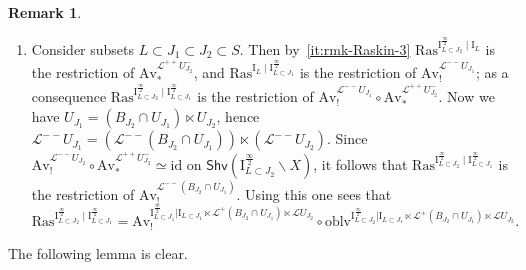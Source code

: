 \documentclass[11pt]{amsart}
\numberwithin{equation}{section}
\theoremstyle{plain}
\theoremstyle{definition}
\newtheorem{rmk}[thm]{Remark}
\newcommand{\sF}{{\mathcal F}}
\newcommand{\I}{{\mathrm I}}
\newcommand{\sL}{{\mathcal L}}
\newcommand{\id}{\mathrm{id}}
\newcommand{\semi}{{{\frac{\infty}{2}}}}
\newcommand{\oblv}{\mathrm{oblv}}
\newcommand{\Av}{\mathrm{Av}}
\newcommand{\simto}{\xrightarrow{\sim}}
\newcommand{\Shv}{\mathsf{Shv}}
\newcommand{\Ras}{\mathrm{Ras}}
\begin{document}
\begin{rmk}
\begin{enumerate}
\begin{equation}
\sL^{++} U_J^- \times \I_{L \subset J} \times \sL^+ U_J \simto \I_L.
\end{equation}
Combining this with the considerations in~\eqref{it:rmk-Raskin-2}, we obtain that for any $\sF$ in $\Shv \left( \I_{L \subset J}^{\semi} \backslash X \right)$ we have
\[
\Ras^{\I_{L \subset J}^{\semi} \mid \I_L}(\sF) \simeq \Av^{\sL^{++} U_J^-}_*(\sF)
\]
where we omit the forgetful functors, and as usual $\Av^{\sL^{++} U_J^-}_*$ is the right adjoint to the corresponding forgetful functor. Similarly, for $\sF$ in $\Shv \left( \I_L \backslash X \right)$ we have
\[
\Ras^{\I_L \mid \I_{L \subset J}^{\semi}}(\sF) \simeq \Av^{\sL^{--} U_J}_!(\sF).
\]
\item
Consider subsets $L \subset J_1 \subset J_2 \subset S$. Then by~\eqref{it:rmk-Raskin-3} $\Ras^{\I_{L \subset J_2}^{\semi} \mid \I_L}$ is the restriction of $\Av^{\sL^{++} U_{J_2}^-}_*$, and $\Ras^{\I_L \mid \I_{L \subset J_1}^{\semi}}$ is the restriction of $\Av^{\sL^{--} U_{J_1}}_!$; as a consequence $\Ras^{\I_{L \subset J_2}^{\semi} \mid \I_{L \subset J_1}^{\semi}}$ is the restriction of $\Av^{\sL^{--} U_{J_1}}_! \circ \Av^{\sL^{++} U_{J_2}^-}_*$. Now we have $U_{J_1} = (B_{J_2} \cap U_{J_1}) \ltimes U_{J_2}$, hence $\sL^{--}U_{J_1} = (\sL^{--} (B_{J_2} \cap U_{J_1})) \ltimes (\sL^{--} U_{J_2})$. Since $\Av_!^{\sL^{--} U_{J_2}} \circ \Av^{\sL^{++} U_{J_2}^-}_* \simeq \id$ on $\Shv \left( \I^{\semi}_{L \subset J_2} \backslash X \right)$, it follows that $\Ras^{\I_{L \subset J_2}^{\semi} \mid \I_{L \subset J_1}^{\semi}}$ is the restriction of $\Av_!^{\sL^{--} (B_{J_2} \cap U_{J_1})}$. Using this one sees that
\[
\Ras^{\I_{L \subset J_2}^{\semi} \mid \I_{L \subset J_1}^{\semi}} = \Av_!^{\I^{\semi}_{L \subset J_1} | \I_{L \subset J_1} \ltimes \sL^+(B_{J_2} \cap U_{J_1}) \ltimes \sL U_{J_2}} \circ \oblv^{\I^{\semi}_{L \subset J_2} | \I_{L \subset J_1} \ltimes \sL^+(B_{J_2} \cap U_{J_1}) \ltimes \sL U_{J_2}}.
\]
\end{enumerate}
\end{rmk}


The following lemma is clear. 
\end{document}
